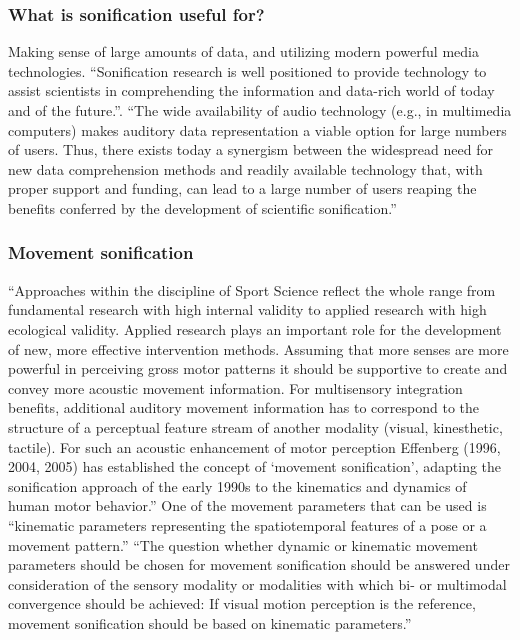 \documentclass[10pt,a4paper,onecolumn]{article}
\begin{document}
\hypertarget{what-is-sonification-useful-for}{%
\subsubsection{What is sonification useful for?}\label{what-is-sonification-useful-for}}

Making sense of large amounts of data, and utilizing modern powerful media technologies. ``Sonification research is well positioned to provide technology to assist scientists in comprehending the information and data-rich world of today and of the future.''. ``The wide availability of audio technology (e.g., in multimedia computers) makes auditory data representation a viable option for large numbers of users. Thus, there exists today a synergism between the widespread need for new data comprehension methods and readily available technology that, with proper support and funding, can lead to a large number of users reaping the benefits conferred by the development of scientific sonification.'' \autocite{kramerSonificationReportStatus1999}

\hypertarget{movement-sonification}{%
\subsubsection{Movement sonification}\label{movement-sonification}}

``Approaches within the discipline of Sport Science reflect the whole range from fundamental research with high internal validity to applied research with high ecological validity. Applied research plays an important role for the development of new, more effective intervention methods. Assuming that more senses are more powerful in perceiving gross motor patterns it should be supportive to create and convey more acoustic movement information. For multisensory integration benefits, additional auditory movement information has to correspond to the structure of a perceptual feature stream of another modality (visual, kinesthetic, tactile). For such an acoustic enhancement of motor perception Effenberg (1996, 2004, 2005) has established the concept of `movement sonification', adapting the sonification approach of the early 1990s to the kinematics and dynamics of human motor behavior.'' One of the movement parameters that can be used is ``kinematic parameters representing the spatiotemporal features of a pose or a movement pattern.'' ``The question whether dynamic or kinematic movement parameters should be chosen for movement sonification should be answered under consideration of the sensory modality or modalities with which bi- or multimodal convergence should be achieved: If visual motion perception is the reference, movement sonification should be based on kinematic parameters.'' \autocite{gerdschmitzSoundJoinedActions2017}
\end{document}
